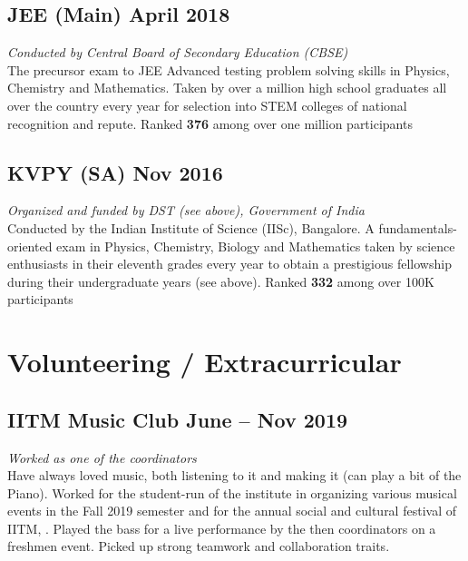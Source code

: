 \documentclass[11pt, a4paper]{article}
\newcommand{\slink}[2]{\href{#1}{\underline{\smash{#2}}}}
\begin{document}
\subsection{JEE (Main) \hfill \large{April 2018}}
\hspace{0.01\linewidth}
\parbox{0.88\linewidth}{
    \textit{Conducted by Central Board of Secondary Education (CBSE)} \\
    {\small The precursor exam to JEE Advanced testing problem solving skills in Physics, Chemistry and Mathematics. Taken by over a million high school graduates all over the country every year for selection into STEM colleges of national recognition and repute. Ranked \textbf{376} among over one million participants}
}

\subsection{KVPY (SA) \hfill \large{Nov 2016}}
\hspace{0.01\linewidth}
\parbox{0.88\linewidth}{
    \textit{Organized and funded by DST (see above), Government of India} \\
    {\small Conducted by the Indian Institute of Science (IISc), Bangalore. A fundamentals-oriented exam in Physics, Chemistry, Biology and Mathematics taken by science enthusiasts in their eleventh grades every year to obtain a prestigious fellowship during their undergraduate years (see above). Ranked \textbf{332} among over 100K participants}
}


\section{Volunteering / Extracurricular}
\subsection{IITM Music Club \hfill \large{June -- Nov 2019}}
\hspace{0.01\linewidth}
\parbox{0.88\linewidth}{
    \textit{Worked as one of the coordinators}  \\
    {\small Have always loved music, both listening to it and making it (can play a bit of the Piano). Worked for the student-run \slink{https://www.instagram.com/iitm_music}{music club} of the institute in organizing various musical events in the Fall 2019 semester and for the annual social and cultural festival of IITM, \slink{https://www.saarang.org/}{Saarang}. Played the bass for a live performance by the then coordinators on a freshmen event. Picked up strong teamwork and collaboration traits.}
}
\end{document}
